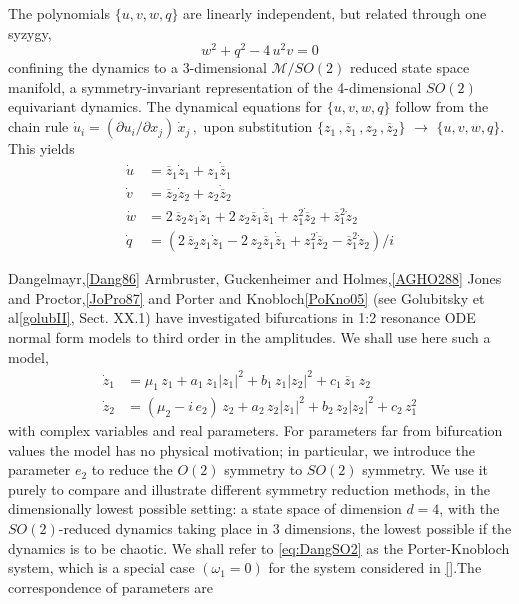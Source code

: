 \documentclass{article}
\begin{document}
 The polynomials $\{u,v,w,q\}$ are
linearly independent, but related through one syzygy,
\begin{equation}
w^2+q^2 - 4\,u^2v =0
\label{eq:syzPK}
\end{equation}
confining the dynamics to a 3-dim\-ens\-ion\-al $\mathcal{M}/SO(2)$ reduced state space
manifold, a symmetry-invariant repre\-sent\-ati\-on of the 4-dim\-ens\-ion\-al
$SO(2)$ equivariant dynamics.
The dynamical equations for $\{u,v,w,q\}$ follow from the chain rule
\( %
 \dot{ u}_i= ({\partial u_i}/{\partial x_j}) \, \dot{x}_j
 \,,
\) %
upon substitution
$\{{z}_1\,,\overline{z}_1\,, {z}_2\,,\overline{z}_2 \}$ $\to$
$\{u,v,w,q\}$. This yields
\begin{align}
  \dot{u} &=\overline{z}_1 \dot{z}_1 + {z}_1 \dot{\overline{z}}_1\\
  \dot{v} &= \overline{z}_2 \dot{z}_2 + {z}_2 \dot{\overline{z}}_2\\
  \dot{w} &= 2 \,\overline{z}_2 {z}_1 \dot{z}_1
           + 2\,{z}_2 \overline{z}_1 \dot{\overline{z}}_1
           + {z}_1^2 \dot{\overline{z}}_2
           + \overline{z}_1^2 \dot{z}_2\\
  \dot{q} &=  (2\,\overline{z}_2 {z}_1 \dot{z}_1
           - 2\,{z}_2 \overline{z}_1 \dot{\overline{z}}_1
           + {z}_1^2 \dot{\overline{z}}_2
           - \overline{z}_1^2 \dot{z}_2
           )/i
\label{PKinvEqs}
\end{align}

Dangelmayr,\ref{Dang86} Armbruster, Guckenheimer and Holmes,\ref{AGHO288}
Jones and Proctor,\ref{JoPro87} and Porter and Knobloch\ref{PoKno05} (see
Golubitsky et al\ref{golubII}, Sect. XX.1) have investigated bifurcations
in 1:2 resonance ODE normal form models to third order in the amplitudes.
We shall use here such a model,
\begin{subequations}\label{eq:DangSO2}
\begin{align}
  \dot{z}_1 &= \mu_1\,z_1+a_1\,z_1|z_1|^2+b_1\,z_1|z_2|^2+c_1\,\overline{z}_1\,z_2\,\\
  \dot{z}_2 &= (\mu_2-i\, e_2)\,{z_2}+a_2\,z_2|z_1|^2+b_2\,z_2|z_2|^2+c_2\,z_1^2
\end{align}
\end{subequations}
with complex variables and real parameters. For parameters
far from bifurcation values the model has no physical motivation; in
particular, we introduce the parameter $e_2$ to reduce the $O(2)$ symmetry to $SO(2)$ symmetry. We use it purely to compare and
illustrate different symmetry reduction methods, in the dimensionally
lowest possible setting: a state space of dimension $d=4$, with the
$SO(2)$-reduced dynamics taking place in 3 dimensions, the lowest
possible if the dynamics is to be chaotic. We shall refer to
\ref{eq:DangSO2} as the Porter-Knobloch system, which is a special case $(\omega_1=0)$ for the system considered in \ref{}.The correspondence of parameters are
\end{document}
